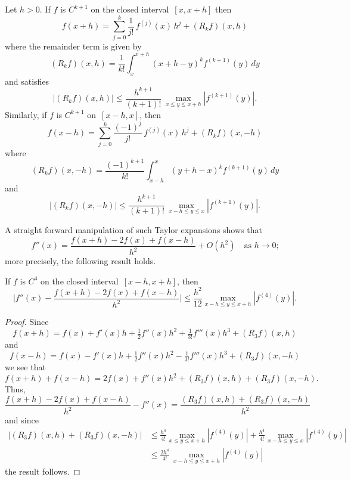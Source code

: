 \begin{theorem}\label{thm: Taylor remainder}
Let $h>0$. If $f$ is $C^{k+1}$ on the closed interval~$[x,x+h]$ then
\[
f(x+h)=\sum_{j=0}^k\frac{1}{j!}\,f^{(j)}(x)\,h^j+(R_kf)(x,h)
\]
where the remainder term is given by
\[
(R_kf)(x,h)=\frac{1}{k!}\int_x^{x+h}(x+h-y)^kf^{(k+1)}(y)\,dy
\]
and satisfies
\[
|(R_kf)(x,h)|\le\frac{h^{k+1}}{(k+1)!}\,\max_{x\le y\le x+h}|f^{(k+1)}(y)|.
\]
Similarly, if $f$ is $C^{k+1}$ on~$[x-h,x]$, then
\[
f(x-h)=\sum_{j=0}^k\frac{(-1)^j}{j!}\,f^{(j)}(x)\,h^j+(R_kf)(x,-h)
\]
where 
\[
(R_kf)(x,-h)=\frac{(-1)^{k+1}}{k!}\int_{x-h}^x(y+h-x)^kf^{(k+1)}(y)\,dy
\]
and
\[
|(R_kf)(x,-h)|\le\frac{h^{k+1}}{(k+1)!}\,\max_{x-h\le y\le x}|f^{(k+1)}(y)|.
\]
\end{theorem}

A straight forward manipulation of such Taylor expansions shows that
\[
f''(x)=\frac{f(x+h)-2f(x)+f(x-h)}{h^2}+O(h^2)\quad\text{as $h\to0$;}
\]
more precisely, the following result holds.

\begin{theorem}\label{thm: 2nd central diff}
If $f$ is $C^4$ on the closed interval~$[x-h,x+h]$, then
\[
\biggl|f''(x)-\frac{f(x+h)-2f(x)+f(x-h)}{h^2}\biggr|\le\frac{h^2}{12}
	\max_{x-h\le y\le x+h}|f^{(4)}(y)|.
\]
\end{theorem}
\begin{proof}
Since
\[
f(x+h)=f(x)+f'(x)h+\tfrac12f''(x)h^2+\tfrac{1}{3!}f'''(x)h^3+(R_3f)(x,h)
\]
and
\[
f(x-h)=f(x)-f'(x)h+\tfrac12f''(x)h^2-\tfrac{1}{3!}f'''(x)h^3+(R_3f)(x,-h)
\]
we see that
\[
f(x+h)+f(x-h)=2f(x)+f''(x)h^2+(R_3f)(x,h)+(R_3f)(x,-h).
\]
Thus,
\begin{equation}\label{eq: second diff remainder}
\frac{f(x+h)-2f(x)+f(x-h)}{h^2}-f''(x)=\frac{(R_3f)(x,h)+(R_3f)(x,-h)}{h^2}
\end{equation}
and since
\begin{align*}
|(R_3f)(x,h)+(R_3f)(x,-h)|&\le
\frac{h^4}{4!}\max_{x\le y\le x+h}|f^{(4)}(y)|
+\frac{h^4}{4!}\max_{x-h\le y\le x}|f^{(4)}(y)|\\
	&\le\frac{2h^4}{4!}\,\max_{x-h\le y\le x+h}|f^{(4)}(y)|
\end{align*}
the result follows.
\end{proof}

